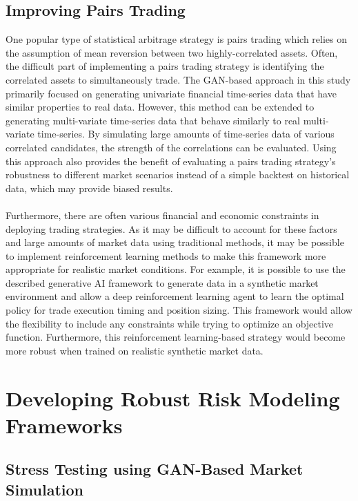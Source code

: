 \subsection{Improving Pairs Trading}

One popular type of statistical arbitrage strategy is pairs trading which relies on the assumption of mean reversion between two highly-correlated assets. Often, the difficult part of implementing a pairs trading strategy is identifying the correlated assets to simultaneously trade. The GAN-based approach in this study primarily focused on generating univariate financial time-series data that have similar properties to real data. However, this method can be extended to generating multi-variate time-series data that behave similarly to real multi-variate time-series. By simulating large amounts of time-series data of various correlated candidates, the strength of the correlations can be evaluated. Using this approach also provides the benefit of evaluating a pairs trading strategy's robustness to different market scenarios instead of a simple backtest on historical data, which may provide biased results.
\\ \\
Furthermore, there are often various financial and economic constraints in deploying trading strategies. As it may be difficult to account for these factors and large amounts of market data using traditional methods, it may be possible to implement reinforcement learning methods to make this framework more appropriate for realistic market conditions. For example, it is possible to use the described generative AI framework to generate data in a synthetic market environment and allow a deep reinforcement learning agent to learn the optimal policy for trade execution timing and position sizing. This framework would allow the flexibility to include any constraints while trying to optimize an objective function. Furthermore, this reinforcement learning-based strategy would become more robust when trained on realistic synthetic market data.

\section{Developing Robust Risk Modeling Frameworks}

\subsection{Stress Testing using GAN-Based Market Simulation}

